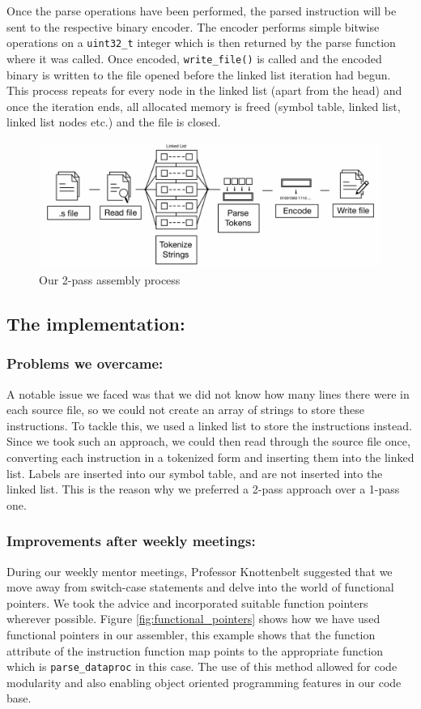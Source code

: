 \documentclass[a4paper]{article}
\begin{document}
Once the parse operations have been performed, the parsed instruction will be sent to the respective binary encoder. The encoder performs simple bitwise operations on a \verb|uint32_t| integer which is then returned by the parse function where it was called. Once encoded, \verb|write_file()| is called and the encoded binary is written to the file opened before the linked list iteration had begun. This process repeats for every node in the linked list (apart from the head) and once the iteration ends, all allocated memory is freed (symbol table, linked list, linked list nodes etc.) and the file is closed.

\begin{figure}[htp]
    \centering
    \includegraphics[width=15cm]{assembler_flow.jpg}
    \caption{Our 2-pass assembly process}
    \label{fig:assembler}
\end{figure}

\subsection{The implementation:}\label{Assembler implementation}
\subsubsection{Problems we overcame: }
A notable issue we faced was that we did not know how many lines there were in each source file, so we could not create an array of strings to store these instructions. To tackle this, we used a linked list to store the instructions instead. Since we took such an approach, we could then read through the source file once, converting each instruction in a tokenized form and inserting them into the linked list. Labels are inserted into our symbol table, and are not inserted into the linked list. This is the reason why we preferred a 2-pass approach over a 1-pass one.

\subsubsection{Improvements after weekly meetings: }
During our weekly mentor meetings, Professor Knottenbelt suggested that we move away from switch-case statements and delve into the world of functional pointers. We took the advice and incorporated suitable function pointers wherever possible. Figure \ref{fig:functional_pointers} shows how we have used functional pointers in our assembler, this example shows that the function attribute of the instruction function map points to the appropriate function which is \verb|parse_dataproc| in this case. The use of this method allowed for code modularity and also enabling object oriented programming features in our code base.
\end{document}
